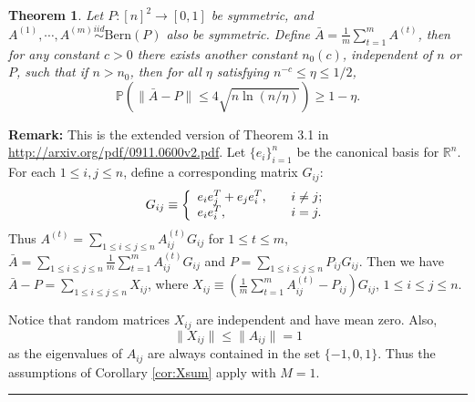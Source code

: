 \documentclass[a4paper]{article}
\newenvironment{proof}{{\bf Proof:  }}{\hfill\rule{2mm}{2mm}}
\newtheorem{theorem}[fact]{Theorem}
\begin{document}
\begin{theorem}
\label{thm:AbarDiff}
Let $P:[n]^2 \rightarrow [0,1]$ be symmetric, and $A^{(1)}, \cdots, A^{(m)} \stackrel{iid}{\sim} \mathrm{Bern}(P)$ also be symmetric. Define $\bar{A} = \frac{1}{m} \sum_{t = 1}^m A^{(t)}$, then for any constant $c > 0$ there exists another constant $n_0(c)$, independent of $n$ or $P$, such that if $n > n_0$, then for all $\eta$ satisfying $n^{-c} \le \eta \le 1/2$,
\[
	\mathbb{P} \left( \| \bar{A} - P \| \le 4 \sqrt{n \ln(n/\eta)} \right) \ge 1 - \eta.
\]
\end{theorem}
\textbf{Remark:} This is the extended version of Theorem 3.1 in \href{url}{http://arxiv.org/pdf/0911.0600v2.pdf}.
\begin{proof}
Let $\{e_i\}_{i=1}^n$ be the canonical basis for $\mathbb{R}^n$. For each $1 \le i, j \le n$, define a corresponding matrix $G_{ij}$:
\[
    G_{ij} \equiv \left\{
    \begin{array}{l l}
        e_i e_j^T + e_j e_i^T, \quad & i \ne j;\\
        e_i e_i^T, \quad & i = j.
    \end{array}
    \right.
\]
Thus $A^{(t)} = \sum_{1 \le i \le j \le n} A^{(t)}_{ij} G_{ij}$ for $1 \le t \le m$, $\bar{A} = \sum_{1 \le i \le j \le n} \frac{1}{m} \sum_{t = 1}^m A^{(t)}_{ij} G_{ij}$ and $P = \sum_{1 \le i \le j \le n} P_{ij} G_{ij}$. Then we have $\bar{A} - P = \sum_{1 \le i \le j \le n} X_{ij}$, where $X_{ij} \equiv \left( \frac{1}{m} \sum_{t=1}^m A_{ij}^{(t)} - P_{ij} \right) G_{ij}$, $1 \le i \le j \le n$.

Notice that random matrices $X_{ij}$ are independent and have mean zero. Also,
\[
	\|X_{ij}\| \le \|A_{ij}\| = 1
\]
as the eigenvalues of $A_{ij}$ are always contained in the set $\{-1, 0, 1\}$. Thus the assumptions of Corollary \ref{cor:Xsum} apply with $M=1$.


\end{proof}
\end{document}
